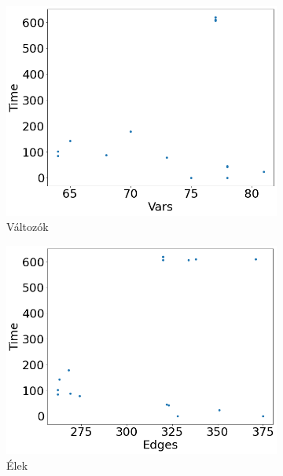 \begin{figure}[ht] 
	\begin{subfigure}[b]{0.5\linewidth}
		\centering
		\includegraphics[width=0.95\linewidth]{figures/ssh/vars.png} 
		\caption{Változók\label{fig_ssh_a}} 
		\vspace{4ex}
	\end{subfigure}%
	\begin{subfigure}[b]{0.5\linewidth}
		\centering
		\includegraphics[width=0.95\linewidth]{figures/ssh/edges.png} 
		\caption{Élek} 
		\vspace{4ex}
	\end{subfigure} 
	\begin{subfigure}[b]{0.5\linewidth}
		\centering

\end{subfigure}
\end{figure}
